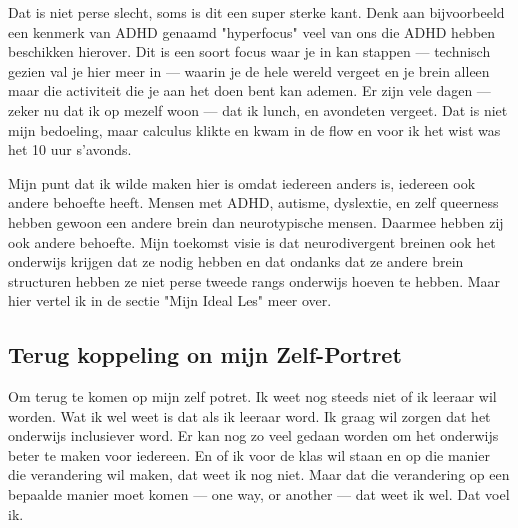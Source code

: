             \bigskip
        
            \noindent Dat is niet perse slecht, soms is dit een super sterke kant. Denk aan bijvoorbeeld een kenmerk van ADHD genaamd "hyperfocus"\cite{hyperfocus} veel van ons die ADHD hebben beschikken hierover. Dit is een soort focus waar je in kan stappen — technisch gezien val je hier meer in — waarin je de hele wereld vergeet en je brein alleen maar die activiteit die je aan het doen bent kan ademen. Er zijn vele dagen — zeker nu dat ik op mezelf woon — dat ik lunch, en avondeten vergeet. Dat is niet mijn bedoeling, maar calculus klikte en kwam in de flow en voor ik het wist was het 10 uur s'avonds.
        
            \bigskip
        
            \noindent Mijn punt dat ik wilde maken hier is omdat iedereen anders is, iedereen ook andere behoefte heeft. Mensen met ADHD, autisme, dyslextie, en zelf queerness hebben gewoon een andere brein dan neurotypische mensen\cite{ADHD-Neurobiologie}\cite{Autisme}\cite{Dyslextie-breinen}\cite{LGBT-vs-CISHET-breinen}. Daarmee hebben zij ook andere behoefte\cite{ADHD-Bijkomende-problematiek}\cite{ADHD-behoeftes}. Mijn toekomst visie is dat neurodivergent breinen ook het onderwijs krijgen dat ze nodig hebben en dat ondanks dat ze andere brein structuren hebben ze niet perse tweede rangs onderwijs hoeven te hebben. Maar hier vertel ik in de sectie "Mijn Ideal Les" meer over.
        
        \subsection{Terug koppeling on mijn Zelf-Portret}
            Om terug te komen op mijn zelf potret. Ik weet nog steeds niet of ik leeraar wil worden. Wat ik wel weet is dat als ik leeraar word. Ik graag wil zorgen dat het onderwijs inclusiever word. Er kan nog zo veel gedaan worden om het onderwijs beter te maken voor iedereen. En of ik voor de klas wil staan en op die manier die verandering wil maken, dat weet ik nog niet. Maar dat die verandering op een bepaalde manier moet komen — one way, or another — dat weet ik wel. Dat voel ik.

    \newpage
